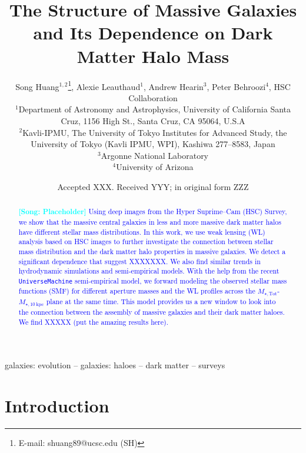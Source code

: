 \documentclass[a4paper,fleqn,usenatbib]{mnras}
\title[Structure of Massive Galaxy and Halo Mass]{The Structure of Massive Galaxies 
    and Its Dependence on Dark Matter Halo Mass}
\author[S. Huang et al.]{
        Song Huang$^{1,2}$\thanks{E-mail: shuang89@ucsc.edu (SH)},
        Alexie Leauthaud$^{1}$,
        Andrew Hearin$^{3}$,
        Peter Behroozi$^{4}$,
        \newauthor
        HSC Collaboration
        \\
        $^{1}$Department of Astronomy and Astrophysics, University of California 
              Santa Cruz, 1156 High St., Santa Cruz, CA 95064, U.S.A\\
        $^{2}$Kavli-IPMU, The University of Tokyo Institutes for Advanced Study, 
              the University of Tokyo (Kavli IPMU, WPI), Kashiwa 277--8583, Japan\\              
        $^{3}$Argonne National Laboratory\\
        $^{4}$University of Arizona
        }
\date{Accepted XXX. Received YYY; in original form ZZZ}
\def\mtot{{$M_{\star,\mathrm{Tot}}$}}
\def\minn{{$M_{\star,10\ \mathrm{kpc}}$}}
\def\um{\texttt{UniverseMachine}}
\newcommand{\plan}[1]{\textcolor{blue}{#1}}
\newcommand{\song}[1]{\textcolor{cyan}{\textbf{[Song: #1]}}}
\begin{document}
\label{firstpage}
\pagerange{\pageref{firstpage}--\pageref{lastpage}}

\maketitle

\begin{abstract}
    
    \song{Placeholder}
    \plan{
    Using deep images from the Hyper Suprime--Cam (HSC) Survey, we show that the 
    massive central galaxies in less and more massive dark matter halos have different 
    stellar mass distributions. 
    In this work, we use weak lensing (WL) analysis based on HSC images to further 
    investigate the connection between stellar mass distribution and the dark matter 
    halo properties in massive galaxies. 
    We detect a significant dependence that suggest XXXXXXX.
    We also find similar trends in hydrodynamic simulations and semi-empirical models. 
    With the help from the recent \um{} semi-empirical model, we forward modeling the 
    observed stellar mass functions (SMF) for different aperture masses and the WL
    profiles across the \mtot{}-\minn{} plane at the same time. 
    This model provides us a new window to look into the connection between the 
    assembly of massive galaxies and their dark matter haloes. 
    We find XXXXX (put the amazing results here). 
    }

\end{abstract}

\begin{keywords}
    galaxies: evolution --
    galaxies: haloes --
    dark matter --
    surveys
\end{keywords}


\section{Introduction}
    \label{sec:intro}
\end{document}

